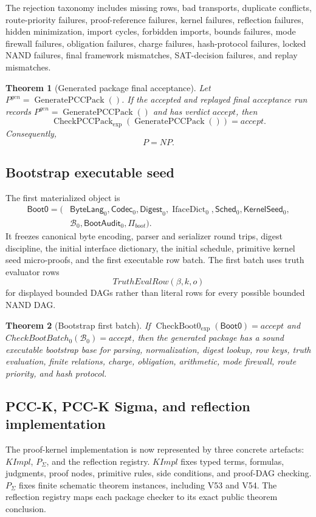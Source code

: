 \documentclass[10.5pt,a4paper]{article}
\newtheorem{theorem}{Theorem}[section]
\newcommand{\CheckPack}{\operatorname{CheckPCCPack}_{\exp}}
\newcommand{\GenPack}{\operatorname{GeneratePCCPack}}
\newcommand{\IfaceDict}{\operatorname{IfaceDict}}
\newcommand{\CheckBoot}{\operatorname{CheckBoot0}_{\exp}}
\begin{document}
The rejection taxonomy includes missing rows, bad transports, duplicate conflicts, route-priority failures, proof-reference failures, kernel failures, reflection failures, hidden minimization, import cycles, forbidden imports, bounds failures, mode firewall failures, obligation failures, charge failures, hash-protocol failures, locked NAND failures, final framework mismatches, SAT-decision failures, and replay mismatches.

\begin{theorem}[Generated package final acceptance]
Let \(P^{gen}=\GenPack()\).  If the accepted and replayed final acceptance run records \(P^{gen}=\GenPack()\) and has verdict \(accept\), then
\[
\CheckPack(\GenPack())=accept.
\]
Consequently,
\[
P=NP.
\]
\end{theorem}

\subsection{Bootstrap executable seed}
The first materialized object is
\[
\begin{aligned}
\mathsf{Boot0}=(&\mathsf{ByteLang}_0,\mathsf{Codec}_0,\mathsf{Digest}_0,\IfaceDict_0,\mathsf{Sched}_0,\mathsf{KernelSeed}_0,\\
&\mathcal B_0,\mathsf{BootAudit}_0,\Pi_{boot}).
\end{aligned}
\]
It freezes canonical byte encoding, parser and serializer round trips, digest discipline, the initial interface dictionary, the initial schedule, primitive kernel seed micro-proofs, and the first executable row batch.  The first batch uses truth evaluator rows
\[
TruthEvalRow(\beta,k,o)
\]
for displayed bounded DAGs rather than literal rows for every possible bounded NAND DAG.

\begin{theorem}[Bootstrap first batch]
If \(\CheckBoot(\mathsf{Boot0})=accept\) and \(CheckBootBatch_0(\mathcal B_0)=accept\), then the generated package has a sound executable bootstrap base for parsing, normalization, digest lookup, row keys, truth evaluation, finite relations, charge, obligation, arithmetic, mode firewall, route priority, and hash protocol.
\end{theorem}



\subsection{PCC-K, PCC-K Sigma, and reflection implementation}
The proof-kernel implementation is now represented by three concrete artefacts: \(KImpl\), \(P_\Sigma\), and the reflection registry.  \(KImpl\) fixes typed terms, formulas, judgments, proof nodes, primitive rules, side conditions, and proof-DAG checking.  \(P_\Sigma\) fixes finite schematic theorem instances, including V53 and V54.  The reflection registry maps each package checker to its exact public theorem conclusion.
\end{document}
